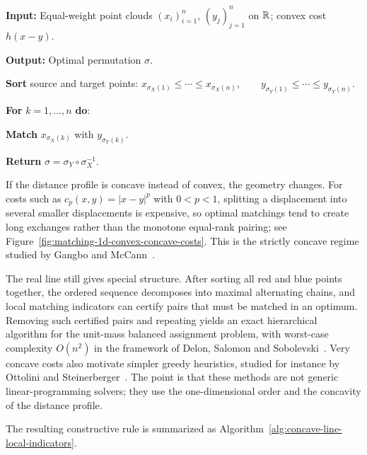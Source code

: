 \begin{alg}\label{alg:one-dimensional-sorting}
\textbf{Input:} Equal-weight point clouds $(x_i)_{i=1}^n$, $(y_j)_{j=1}^n$ on $\mathbb{R}$; convex cost $h(x-y)$.

\textbf{Output:} Optimal permutation $\sigma$.

\textbf{Sort} source and target points:
\(x_{\sigma_X(1)}\leq\cdots\leq x_{\sigma_X(n)}, \qquad y_{\sigma_Y(1)}\leq\cdots\leq y_{\sigma_Y(n)}.\)

\textbf{For} $k=1,\ldots,n$ \textbf{do}:
\begin{algblock}

\textbf{Match} $x_{\sigma_X(k)}$ with $y_{\sigma_Y(k)}$.

\end{algblock}
\algreturnskip
\textbf{Return} \(\sigma=\sigma_Y\circ\sigma_X^{-1}.\)
\end{alg}

If the distance profile is concave instead of convex, the geometry changes. For costs such as $c_p(x,y)=|x-y|^p$ with $0<p<1$, splitting a displacement into several smaller displacements is expensive, so optimal matchings tend to create long exchanges rather than the monotone equal-rank pairing; see Figure~\ref{fig:matching-1d-convex-concave-costs}. This is the strictly concave regime studied by Gangbo and McCann~\cite{gangbo1996geometry}.

The real line still gives special structure. After sorting all red and blue points together, the ordered sequence decomposes into maximal alternating chains, and local matching indicators can certify pairs that must be matched in an optimum. Removing such certified pairs and repeating yields an exact hierarchical algorithm for the unit-mass balanced assignment problem, with worst-case complexity $O(n^2)$ in the framework of Delon, Salomon and Sobolevski~\cite{delon-concave}. Very concave costs also motivate simpler greedy heuristics, studied for instance by Ottolini and Steinerberger~\cite{OttoliniSteinerberger2023GreedyConcave}. The point is that these methods are not generic linear-programming solvers; they use the one-dimensional order and the concavity of the distance profile.

The resulting constructive rule is summarized as Algorithm~\ref{alg:concave-line-local-indicators}.

